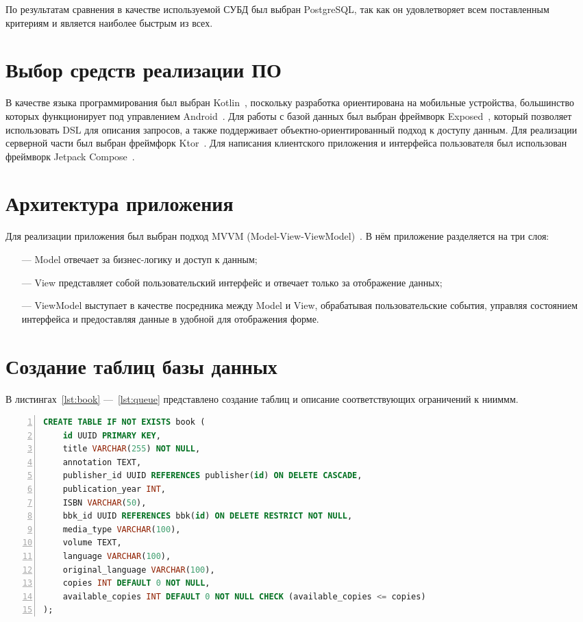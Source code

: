 По результатам сравнения в качестве используемой СУБД был выбран PostgreSQL, так как он удовлетворяет всем поставленным критериям и является наиболее быстрым из всех.

\section{Выбор средств реализации ПО}

В качестве языка программирования был выбран Kotlin~\cite{Kotlin}, поскольку разработка ориентирована на мобильные устройства, большинство которых функционирует под управлением Android~\cite{Android_stat}. Для работы с базой данных был выбран фреймворк Exposed~\cite{Exposed}, который позволяет использовать DSL для описания запросов, а также поддерживает объектно-ориентированный подход к доступу данным. Для реализации серверной части был выбран фреймфорк Ktor~\cite{Ktor}. Для написания клиентского приложения и интерфейса пользователя был использован фреймворк Jetpack Compose~\cite{Compose}.

\section{Архитектура приложения}
Для реализации приложения был выбран подход MVVM (Model-View-ViewModel)~\cite{MVVM}. В нём приложение разделяется на три слоя:

\begin{itemize}
	\item[---] Model отвечает за бизнес-логику и доступ к данным;
	\item[---] View представляет собой пользовательский интерфейс и отвечает только за отображение данных;
	\item[---] ViewModel выступает в качестве посредника между Model и View, обрабатывая пользовательские события, управляя состоянием интерфейса и предоставляя данные в удобной для отображения форме.
\end{itemize}

\section{Создание таблиц базы данных}

В листингах~\ref{lst:book} ---~\ref{lst:queue} представлено создание таблиц и описание соответствующих ограничений к нииммм.

\begin{center}
	\captionsetup{justification=raggedright,singlelinecheck=off}
	\begin{lstlisting}[language=sql, frame=single, numbers=left, label=lst:book, caption=Создание таблицы book]
CREATE TABLE IF NOT EXISTS book (
	id UUID PRIMARY KEY,
	title VARCHAR(255) NOT NULL,
	annotation TEXT,
	publisher_id UUID REFERENCES publisher(id) ON DELETE CASCADE,
	publication_year INT,
	ISBN VARCHAR(50),
	bbk_id UUID REFERENCES bbk(id) ON DELETE RESTRICT NOT NULL,
	media_type VARCHAR(100),
	volume TEXT,
	language VARCHAR(100),
	original_language VARCHAR(100),
	copies INT DEFAULT 0 NOT NULL,
	available_copies INT DEFAULT 0 NOT NULL CHECK (available_copies <= copies)
);
	\end{lstlisting}
\end{center}

